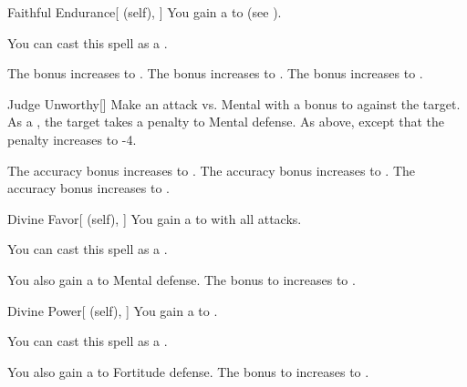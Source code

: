 \lowercase{\hypertarget{spell:Faithful Endurance}{}}\label{spell:Faithful Endurance}
\begin{attuneability}[Rank 2]{\hypertarget{spell:Faithful Endurance}{Faithful Endurance}}[ (self), ]
You gain a   to  (see ).

You can cast this spell as a .

\rankline
{} The bonus increases to .
 The bonus increases to .
 The bonus increases to .
\end{attuneability}
\vspace{0.25em}



\lowercase{\hypertarget{spell:Judge Unworthy}{}}\label{spell:Judge Unworthy}
\begin{freeability}[Rank 2]{\hypertarget{spell:Judge Unworthy}{Judge Unworthy}}[]
Make an attack vs. Mental with a  bonus to  against the target.
\hit As a , the target takes a  penalty to Mental defense.
\crit As above, except that the penalty increases to -4.

\rankline
{} The accuracy bonus increases to .
 The accuracy bonus increases to .
 The accuracy bonus increases to .
\end{freeability}
\vspace{0.25em}



\lowercase{\hypertarget{spell:Divine Favor}{}}\label{spell:Divine Favor}
\begin{attuneability}[Rank 3]{\hypertarget{spell:Divine Favor}{Divine Favor}}[ (self), ]
You gain a   to  with all attacks.

You can cast this spell as a .

\rankline
{} You also gain a   to Mental defense.
 The bonus to  increases to .
\end{attuneability}
\vspace{0.25em}



\lowercase{\hypertarget{spell:Divine Power}{}}\label{spell:Divine Power}
\begin{attuneability}[Rank 3]{\hypertarget{spell:Divine Power}{Divine Power}}[ (self), ]
You gain a   to .

You can cast this spell as a .

\rankline
{} You also gain a   to Fortitude defense.
 The bonus to  increases to .
\end{attuneability}
\vspace{0.25em}



